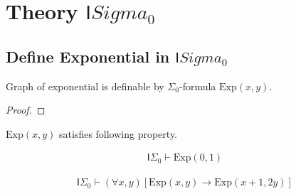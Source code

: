 \chapter{Theory $\mathsf{I}Sigma_0$}

\section{Define Exponential in $\mathsf{I}Sigma_0$}

\begin{theorem}\label{LO.FirstOrder.Arith.Model.Exponential.defined}\leanok
  Graph of exponential is definable by $\Sigma_0$-formula $\mathrm{Exp}(x, y)$.
\end{theorem}
\begin{proof}\leanok

\end{proof}

$\mathrm{Exp}(x, y)$ satisfies following property.

\begin{lemma}\label{LO.FirstOrder.Arith.Model.Exponential.exponential_zero_one}
  \leanok

  \begin{align*}
    \mathsf{I}\Sigma_0 \vdash \mathrm{Exp}(0, 1)
  \end{align*}
\end{lemma}

\begin{lemma}\label{LO.FirstOrder.Arith.Model.Exponential.succ}
  \leanok
  
  \begin{align*}
    \mathsf{I}\Sigma_0 \vdash (\forall x, y)[\mathrm{Exp}(x, y) \to \mathrm{Exp}(x + 1, 2y)]
  \end{align*}
\end{lemma}